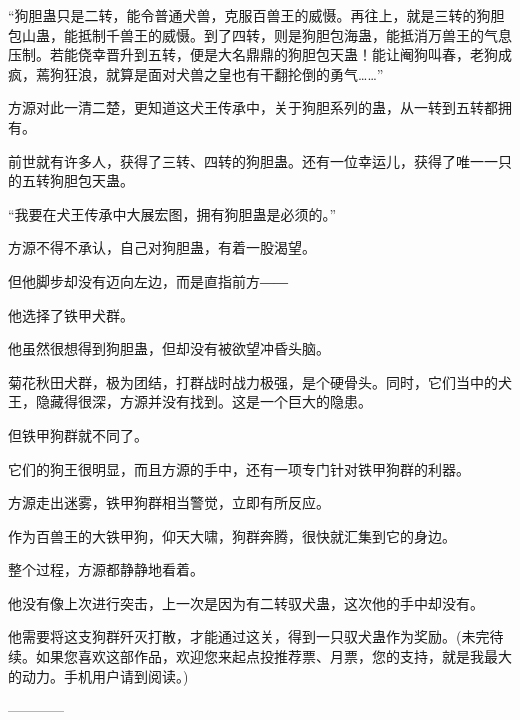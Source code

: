\begin{this_body}
“狗胆蛊只是二转，能令普通犬兽，克服百兽王的威慑。再往上，就是三转的狗胆包山蛊，能抵制千兽王的威慑。到了四转，则是狗胆包海蛊，能抵消万兽王的气息压制。若能侥幸晋升到五转，便是大名鼎鼎的狗胆包天蛊！能让阉狗叫春，老狗成疯，蔫狗狂浪，就算是面对犬兽之皇也有干翻抡倒的勇气……”

方源对此一清二楚，更知道这犬王传承中，关于狗胆系列的蛊，从一转到五转都拥有。

前世就有许多人，获得了三转、四转的狗胆蛊。还有一位幸运儿，获得了唯一一只的五转狗胆包天蛊。

“我要在犬王传承中大展宏图，拥有狗胆蛊是必须的。”

方源不得不承认，自己对狗胆蛊，有着一股渴望。

但他脚步却没有迈向左边，而是直指前方――

他选择了铁甲犬群。

他虽然很想得到狗胆蛊，但却没有被欲望冲昏头脑。

菊花秋田犬群，极为团结，打群战时战力极强，是个硬骨头。同时，它们当中的犬王，隐藏得很深，方源并没有找到。这是一个巨大的隐患。

但铁甲狗群就不同了。

它们的狗王很明显，而且方源的手中，还有一项专门针对铁甲狗群的利器。

方源走出迷雾，铁甲狗群相当警觉，立即有所反应。

作为百兽王的大铁甲狗，仰天大啸，狗群奔腾，很快就汇集到它的身边。

整个过程，方源都静静地看着。

他没有像上次进行突击，上一次是因为有二转驭犬蛊，这次他的手中却没有。

他需要将这支狗群歼灭打散，才能通过这关，得到一只驭犬蛊作为奖励。(未完待续。如果您喜欢这部作品，欢迎您来起点投推荐票、月票，您的支持，就是我最大的动力。手机用户请到阅读。)

------------

\end{this_body}


